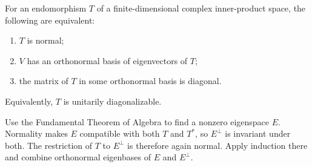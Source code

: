 \begin{theorem}\label{thm:complex-spectral-theorem}
For an endomorphism \(T\) of a finite-dimensional complex inner-product
space, the following are equivalent:
\begin{enumerate}
\item \(T\) is normal;
\item \(V\) has an orthonormal basis of eigenvectors of \(T\);
\item the matrix of \(T\) in some orthonormal basis is diagonal.
\end{enumerate}
Equivalently, \(T\) is unitarily diagonalizable.
\end{theorem}
\begin{proofidea}
Use the Fundamental Theorem of Algebra to find a nonzero eigenspace \(E\).
Normality makes \(E\) compatible with both \(T\) and \(T^*\), so \(E^\perp\)
is invariant under both. The restriction of \(T\) to \(E^\perp\) is therefore
again normal. Apply induction there and combine orthonormal eigenbases of
\(E\) and \(E^\perp\).
\end{proofidea}
